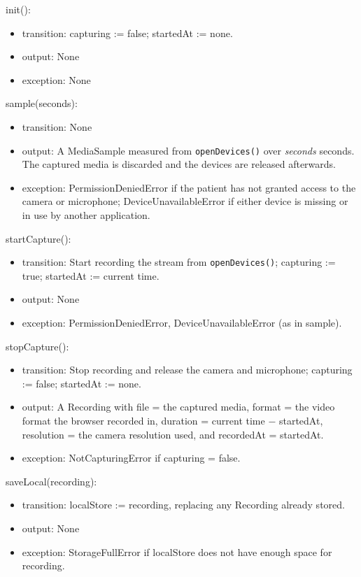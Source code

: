 \documentclass[12pt, titlepage]{article}
\begin{document}
\noindent init():
\begin{itemize}
\item transition: capturing := false; startedAt := none.
\item output: None
\item exception: None
\end{itemize}

\noindent sample(seconds):
\begin{itemize}
\item transition: None
\item output: A MediaSample measured from \texttt{openDevices()} over
  \emph{seconds} seconds. The captured media is discarded and the devices are
  released afterwards.
\item exception: PermissionDeniedError if the patient has not granted access to
  the camera or microphone; DeviceUnavailableError if either device is missing
  or in use by another application.
\end{itemize}

\noindent startCapture():
\begin{itemize}
\item transition: Start recording the stream from \texttt{openDevices()};
  capturing := true; startedAt := current time.
\item output: None
\item exception: PermissionDeniedError, DeviceUnavailableError (as in sample).
\end{itemize}

\noindent stopCapture():
\begin{itemize}
\item transition: Stop recording and release the camera and microphone;
  capturing := false; startedAt := none.
\item output: A Recording with file = the captured media, format =
  the video format the browser recorded in, duration = current time $-$ startedAt, resolution = the
  camera resolution used, and recordedAt = startedAt.
\item exception: NotCapturingError if capturing = false.
\end{itemize}

\noindent saveLocal(recording):
\begin{itemize}
\item transition: localStore := recording, replacing any Recording already
  stored.
\item output: None
\item exception: StorageFullError if localStore does not have enough space for
  recording.
\end{itemize}
\end{document}
